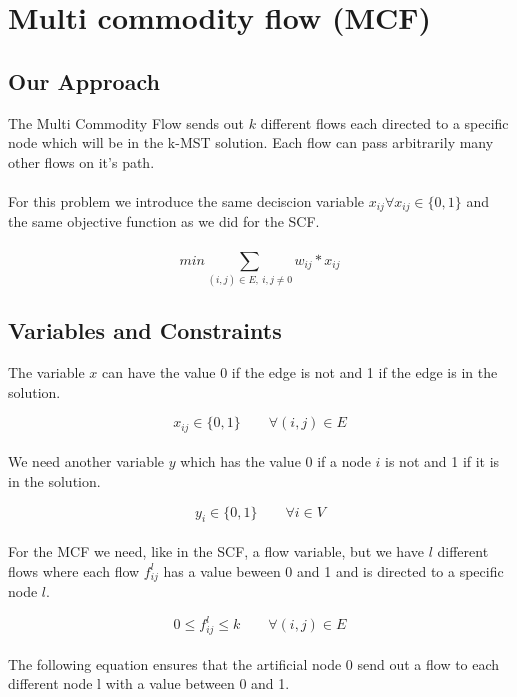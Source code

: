 \section{Multi commodity flow (MCF)}
\subsection{Our Approach}
The Multi Commodity Flow sends out $k$ different flows each directed to a specific node which will be in the k-MST solution. Each flow can pass arbitrarily many other flows on it's path.
\\
\\
For this problem we introduce the same deciscion variable $x_{ij} \forall x_{ij} \in \{0,1\}$ and the same objective function as we did for the SCF.\\
\\
\begin{equation}
  min \sum_{(i,j) \in E, \ i,j \not =  0} w_{ij} * x_{ij} 
\end{equation}

\subsection{Variables and Constraints}

The variable $x$ can have the value 0 if the edge is not and 1 if the edge is in the solution. 

\begin{equation}
  x_{ij} \in \{0,1\} \qquad \forall (i,j) \in E
\end{equation}
\\
We need another variable $y$ which has the value 0 if a node $i$ is not and 1 if it is in the solution.

\begin{equation}
  y_i \in \{0,1\} \qquad \forall i \in V
\end{equation}
\\
For the MCF we need, like in the SCF, a flow variable, but we have $l$ different flows where each flow $f_{ij}^l$ has a value beween 0 and 1 and is directed to a specific node $l$.

\begin{equation}
  0 \leq f_{ij}^l \leq k \qquad \forall (i,j) \in E
\end{equation}
\\
The following equation ensures that the artificial node $0$ send out a flow to each different node l with a value between 0 and 1.

